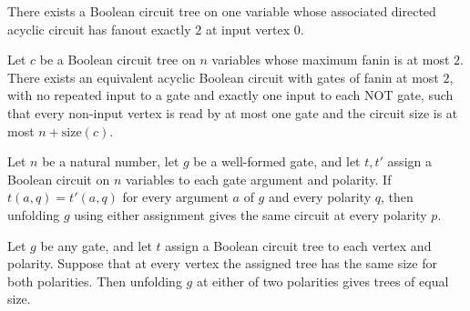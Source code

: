 \begin{theorem}
\label{BoolCircuit.TreeCircuit.exists_toDAG_input_fanout_two}
\leanok
{}
There exists a Boolean circuit tree on one variable whose associated directed acyclic
circuit has fanout exactly $2$ at input vertex $0$.
\end{theorem}

\begin{theorem}
\label{BoolCircuit.TreeCircuit.exists_dagCircuit_fanout_le_one}
\leanok
{}
Let $c$ be a Boolean circuit tree on $n$ variables whose maximum fanin is at most $2$.
There exists an equivalent acyclic Boolean circuit with gates of fanin at most $2$, with
no repeated input to a gate and exactly one input to each NOT gate, such that every
non-input vertex is read by at most one gate and the circuit size is at most
$n+\mathrm{size}(c)$.
\end{theorem}

\begin{theorem}
\label{BoolCircuit.unfoldGate_congr}
\leanok
{}
Let $n$ be a natural number, let $g$ be a well-formed gate, and let $t,t'$ assign a
Boolean circuit on $n$ variables to each gate argument and polarity. If $t(a,q)=t'(a,q)$
for every argument $a$ of $g$ and every polarity $q$, then unfolding $g$ using either
assignment gives the same circuit at every polarity $p$.
\end{theorem}

\begin{theorem}
\label{BoolCircuit.size_unfoldGate_polarity}
\leanok
{}
Let $g$ be any gate, and let $t$ assign a Boolean circuit tree to each vertex and
polarity. Suppose that at every vertex the assigned tree has the same size for both
polarities. Then unfolding $g$ at either of two polarities gives trees of equal size.
\end{theorem}

